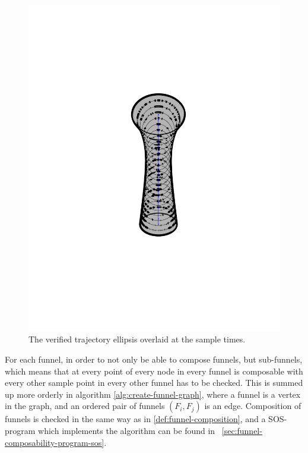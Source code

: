 \begin{figure}
\begin{minipage}[b]{0.4\textwidth}
    \includegraphics[width=\textwidth]{figures/method/funnel-sampled}
    \caption{The verified trajectory ellipsis overlaid at the sample times.}
  \end{minipage}
\end{figure}

For each funnel, in order to not only be able to compose funnels, but
sub-funnels, which means that at every point of every node in every funnel is
composable with every other sample point in every other funnel has to be
checked. This is summed up more orderly in algorithm
\cref{alg:create-funnel-graph}, where a funnel is a vertex in the graph, and an
ordered pair of funnels \(\left( F_{i}, F_{j} \right)\) is an edge. Composition
of funnels is checked in the same way as in \cref{def:funnel-composition}, and a
\ac{SOS}-program which implements the algorithm can be found in
~\cref{sec:funnel-composability-program-sos}.

